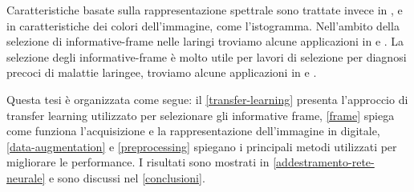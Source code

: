 Caratteristiche basate sulla rappresentazione spettrale sono trattate invece in \citeauthor{atasoy_endoscopic} \cite{atasoy_endoscopic}, \citeauthor{haji_wce} \cite{haji_wce} e in \citeauthor{bashar_endoscopy} \cite{bashar_endoscopy} caratteristiche dei colori dell'immagine, come l'istogramma. Nell'ambito della selezione di informative-frame nelle laringi troviamo alcune applicazioni in \citeauthor{moccia_workflow} \cite{moccia_workflow} \citeauthor{moccia_larynge_2} \cite{moccia_larynge_2} e \citeauthor{patrini_tl} \cite{patrini_tl}. La selezione degli informative-frame è molto utile per lavori di selezione per diagnosi precoci di malattie laringee, troviamo alcune applicazioni in \citeauthor{moccia_larynge} \cite{moccia_larynge} \citeauthor{turkmen_larynge} \cite{turkmen_larynge} e \citeauthor{narbalata_larynge} \cite{narbalata_larynge}.

Questa tesi è organizzata come segue: il \cref{transfer-learning} presenta l'approccio di transfer learning utilizzato per selezionare gli informative frame, \cref{frame} spiega come funziona l'acquisizione e la rappresentazione dell'immagine in digitale, \cref{data-augmentation}  e  \cref{preprocessing} spiegano i principali metodi utilizzati per migliorare le performance. I risultati sono mostrati in \cref{addestramento-rete-neurale} e sono discussi nel \cref{conclusioni}.